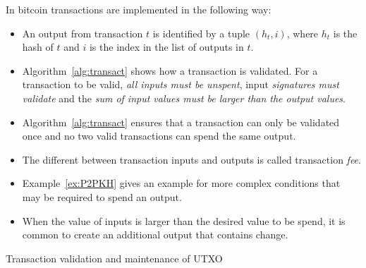 \begin{note}
	\label{bitcoin:transactions}
	In bitcoin transactions are implemented in the following way:
	\begin{itemize}
		\item An output from transaction $t$ is identified by a tuple $(h_t,i)$,
		where $h_t$ is the hash of $t$ and $i$ is the index in the list of outputs in $t$.
		\item Algorithm~\ref{alg:transact} shows how a transaction is validated.
		For a transaction to be valid, \emph{all inputs must be unspent}, input \emph{signatures must validate} and the \emph{sum of input values must be larger than the  output values}.
		\item Algorithm~\ref{alg:transact} ensures that a transaction can only be validated once and no two valid transactions can spend the same output.
		\item The different between transaction inputs and outputs is called transaction \emph{fee}.
		\item Example~\ref{ex:P2PKH} gives an example for more complex conditions that may be required to spend an output.
		\item When the value of inputs is larger than the desired value to be spend, it is common to create an additional output that contains change.
	\end{itemize}
	
\end{note}

\begin{algorithm}[h!]
	\caption{Transaction validation and maintenance of UTXO}
	\label{alg:transact}
	\begin{algorithmic}
				\EndIf
				\EndIf
			\EndFor
			\EndIf
			
				 
			\EndFor
			
			
		\EndProcedure
	\end{algorithmic}
\end{algorithm}

